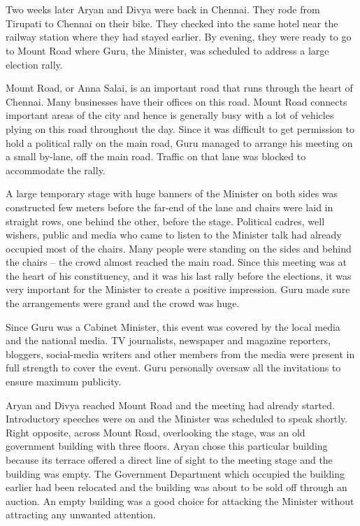 \chapter{}

Two weeks later Aryan and Divya were back in Chennai. They rode from Tirupati to
Chennai on their bike. They checked into the same hotel near the railway station
where they had stayed earlier. By evening, they were ready to go to Mount Road
where Guru, the Minister, was scheduled to address a large election rally.

Mount Road, or Anna Salai, is an important road that runs through the heart of
Chennai. Many businesses have their offices on this road. Mount Road connects
important areas of the city and hence is generally busy with a lot of vehicles
plying on this road throughout the day. Since it was difficult to get permission
to hold a political rally on the main road, Guru managed to arrange his meeting
on a small by-lane, off the main road. Traffic on that lane was blocked to
accommodate the rally.

A large temporary stage with huge banners of the Minister on both sides was
constructed few meters before the far-end of the lane and chairs were laid in
straight rows, one behind the other, before the stage. Political cadres, well
wishers, public and media who came to listen to the Minister talk had already
occupied most of the chairs. Many people were standing on the sides and behind
the chairs – the crowd almost reached the main road. Since this meeting was at
the heart of his constituency, and it was his last rally before the elections,
it was very important for the Minister to create a positive impression. Guru
made sure the arrangements were grand and the crowd was huge.

Since Guru was a Cabinet Minister, this event was covered by the local media and
the national media. TV journalists, newspaper and magazine reporters, bloggers,
social-media writers and other members from the media were present in full
strength to cover the event. Guru personally oversaw all the invitations to
ensure maximum publicity.

Aryan and Divya reached Mount Road and the meeting had already started.
Introductory speeches were on and the Minister was scheduled to speak shortly.
Right opposite, across Mount Road, overlooking the stage, was an old government
building with three floors. Aryan chose this particular building because its
terrace offered a direct line of sight to the meeting stage and the building was
empty. The Government Department which occupied the building earlier had been
relocated and the building was about to be sold off through an auction. An empty
building was a good choice for attacking the Minister without attracting any
unwanted attention.

